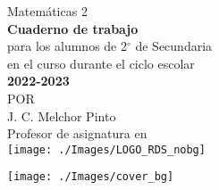 \documentclass[./Mate2.tex]{subfiles}
\begin{document}
\pagestyle{empty}
\begin{center}
    \vspace{4cm}
    {\Huge Matem\'aticas 2}\\
    \vspace{1cm}
    \normalsize
    \textbf{\large Cuaderno de trabajo}\\
    para los alumnos de 2$^\circ$ de  Secundaria\\
    en el curso durante el ciclo escolar\\
    \textbf{2022-2023}\\
    \vspace{2cm}
    \small POR\\
    \Large J. C. Melchor Pinto\\[0.5em]
    \normalsize Profesor de asignatura en\\
    \vspace{2cm}
    \texttt{[image: ./Images/LOGO\_RDS\_nobg]}\\
    \vspace{1cm}
\end{center}
%
\texttt{[image: ./Images/cover\_bg]}
\end{document}
